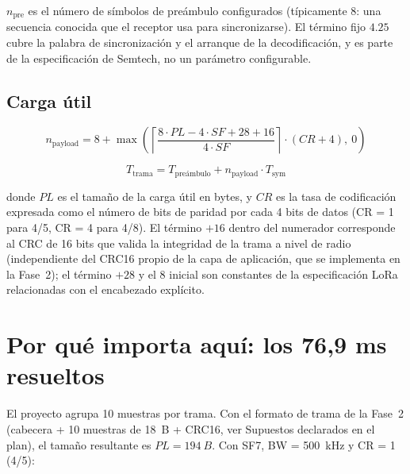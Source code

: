 $n_{\text{pre}}$ es el número de símbolos de preámbulo configurados (típicamente 8: una
secuencia conocida que el receptor usa para sincronizarse). El término fijo $4.25$ cubre la
palabra de sincronización y el arranque de la decodificación, y es parte de la especificación
de Semtech, no un parámetro configurable.

\subsection*{Carga útil}

\begin{equation}
  n_{\text{payload}} = 8 + \max\!\left(
    \left\lceil \frac{8 \cdot PL - 4 \cdot SF + 28 + 16}{4 \cdot SF} \right\rceil
    \cdot (CR + 4),\ 0 \right)
  \label{eq:npayload}
\end{equation}

\begin{equation}
  T_{\text{trama}} = T_{\text{preámbulo}} + n_{\text{payload}} \cdot T_{\text{sym}}
  \label{eq:ttrama}
\end{equation}

donde $PL$ es el tamaño de la carga útil en bytes, y $CR$ es la tasa de codificación expresada
como el número de bits de paridad por cada 4 bits de datos (CR = 1 para 4/5, CR = 4 para 4/8).
El término $+16$ dentro del numerador corresponde al CRC de 16 bits que valida la integridad de
la trama a nivel de radio (independiente del CRC16 propio de la capa de aplicación, que se
implementa en la Fase~2); el término $+28$ y el $8$ inicial son constantes de la
especificación LoRa relacionadas con el encabezado explícito.

\section{Por qué importa aquí: los 76,9 ms resueltos}

El proyecto agrupa 10 muestras por trama. Con el formato de trama de la Fase~2 (cabecera +
10 muestras de \SI{18}{B} + CRC16, ver Supuestos declarados en el plan), el tamaño resultante
es $PL = \SI{194}{B}$. Con SF7, BW = \SI{500}{kHz} y CR = 1 (4/5):

